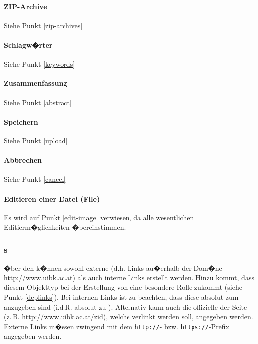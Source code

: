 \paragraph{ZIP-Archive}
Siehe Punkt \ref{zip-archives}

\paragraph{Schlagw�rter}
Siehe Punkt \ref{keywords}

\paragraph{Zusammenfassung}
Siehe Punkt \ref{abstract}


\paragraph{Speichern}
Siehe Punkt \ref{upload}

\paragraph{Abbrechen}

Siehe Punkt \ref{cancel}

\paragraph{Editieren einer Datei (File)}
Es wird auf Punkt \ref{edit-image} verwiesen, da alle wesentlichen Editierm�glichkeiten
�bereinstimmen.

%

\subsubsection{s}
\label{urllinks}

�ber den   k�nnen sowohl externe (d.h. Links au�erhalb
der Dom�ne \url{http://www.uibk.ac.at}) als auch interne Links erstellt
werden. Hinzu kommt, dass diesem Objekttyp bei der Erstellung von
 eine besondere Rolle zukommt (siehe Punkt \ref{deplinks}). Bei internen Links ist zu beachten, dass diese absolut zum  anzugeben sind (i.d.R. absolut zu ). Alternativ kann
auch die offizielle  der Seite (z.\,B. \url{http://www.uibk.ac.at/zid}),
welche verlinkt werden soll, angegeben werden. Externe Links m�ssen
zwingend mit dem \nolinkurl{http://}- bzw. \nolinkurl{https://}-Prefix angegeben werden.

